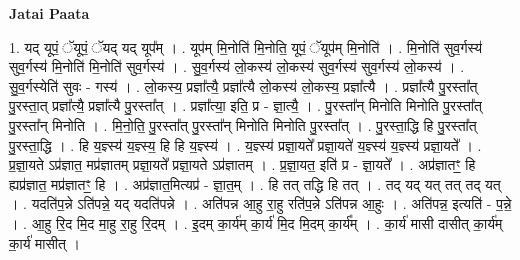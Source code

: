 \documentclass[17pt]{extarticle}
\begin{document}
\textbf{Jatai Paata} \newline

1. यद् यूपं॒ ॅयूपं॒ ॅयद् यद् यूप᳚म् । . यूप॑म् मि॒नोति॑ मि॒नोति॒ यूपं॒ ॅयूप॑म् मि॒नोति॑ । . मि॒नोति॑ सुव॒र्गस्य॑ सुव॒र्गस्य॑ मि॒नोति॑ मि॒नोति॑ सुव॒र्गस्य॑ । . सु॒व॒र्गस्य॑ लो॒कस्य॑ लो॒कस्य॑ सुव॒र्गस्य॑ सुव॒र्गस्य॑ लो॒कस्य॑ । . सु॒व॒र्गस्येति॑ सुवः - गस्य॑ । . लो॒कस्य॒ प्रज्ञा᳚त्यै॒ प्रज्ञा᳚त्यै लो॒कस्य॑ लो॒कस्य॒ प्रज्ञा᳚त्यै । . प्रज्ञा᳚त्यै पु॒रस्ता᳚त् पु॒रस्ता॒त् प्रज्ञा᳚त्यै॒ प्रज्ञा᳚त्यै पु॒रस्ता᳚त् । . प्रज्ञा᳚त्या॒ इति॒ प्र - ज्ञा॒त्यै॒ । . पु॒रस्ता᳚न् मिनोति मिनोति पु॒रस्ता᳚त् पु॒रस्ता᳚न् मिनोति । . मि॒नो॒ति॒ पु॒रस्ता᳚त् पु॒रस्ता᳚न् मिनोति मिनोति पु॒रस्ता᳚त् । . पु॒रस्ता॒द्धि हि पु॒रस्ता᳚त् पु॒रस्ता॒द्धि । . हि य॒ज्ञ्स्य॑ य॒ज्ञ्स्य॒ हि हि य॒ज्ञ्स्य॑ । . य॒ज्ञ्स्य॑ प्रज्ञा॒यते᳚ प्रज्ञा॒यते॑ य॒ज्ञ्स्य॑ य॒ज्ञ्स्य॑ प्रज्ञा॒यते᳚ । . प्र॒ज्ञा॒यते ऽप्र॑ज्ञात॒ मप्र॑ज्ञातम् प्रज्ञा॒यते᳚ प्रज्ञा॒यते ऽप्र॑ज्ञातम् । . प्र॒ज्ञा॒यत॒ इति॑ प्र - ज्ञा॒यते᳚ । . अप्र॑ज्ञातꣳ॒॒ हि ह्यप्र॑ज्ञात॒ मप्र॑ज्ञातꣳ॒॒ हि । . अप्र॑ज्ञात॒मित्यप्र॑ - ज्ञा॒त॒म् । . हि तत् तद्धि हि तत् । . तद् यद् यत् तत् तद् यत् । . यदति॑प॒न्ने ऽति॑पन्ने॒ यद् यदति॑पन्ने । . अति॑पन्न आ॒हु रा॒हु रति॑प॒न्ने ऽति॑पन्न आ॒हुः । . अति॑पन्न॒ इत्यति॑ - प॒न्ने॒ । . आ॒हु रि॒द मि॒द मा॒हु रा॒हु रि॒दम् । . इ॒दम् का॒र्य॑म् का॒र्य॑ मि॒द मि॒दम् का॒र्य᳚म् । . का॒र्य॑ मासी दासीत् का॒र्य॑म् का॒र्य॑ मासीत् । \newline
\end{document}
